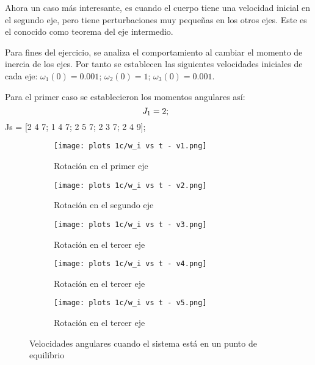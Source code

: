 \documentclass[letterpaper, 12pt]{article}
\begin{document}
\begin{enumerate}
\begin{enumerate}
Ahora un caso más interesante, es cuando el cuerpo tiene una velocidad inicial en el segundo eje, pero tiene perturbaciones muy pequeñas en los otros ejes. Este es el conocido como teorema del eje intermedio.

Para fines del ejercicio, se analiza el comportamiento al cambiar el momento de inercia de los ejes. Por tanto se establecen las siguientes velocidades iniciales de cada eje:
$\omega_1(0) = 0.001$; $\omega_2(0) = 1$; $\omega_3(0) = 0.001$.

Para el primer caso se establecieron los momentos angulares así:
$$J_1 = 2;\hspace{0.25cm}$$
Js = [2 4 7;
      1 4 7;
      2 5 7;
      2 3 7;
      2 4 9];

\begin{figure}[h!]
    \centering
    \hspace{1cm}
    \begin{subfigure}[h]{0.3\linewidth}
        \texttt{[image: plots 1c/w\_i vs t - v1.png]}
        \caption{\centering Rotación en el primer eje}
    \end{subfigure}
    \begin{subfigure}[h]{0.3\linewidth}
        \texttt{[image: plots 1c/w\_i vs t - v2.png]}
        \caption{\centering Rotación en el segundo eje}
    \end{subfigure}
    \begin{subfigure}[h]{0.3\linewidth}
        \texttt{[image: plots 1c/w\_i vs t - v3.png]}
        \caption{\centering Rotación en el tercer eje}
    \end{subfigure}
    \begin{subfigure}[h]{0.3\linewidth}
        \texttt{[image: plots 1c/w\_i vs t - v4.png]}
        \caption{\centering Rotación en el tercer eje}
    \end{subfigure}
    \begin{subfigure}[h]{0.3\linewidth}
        \texttt{[image: plots 1c/w\_i vs t - v5.png]}
        \caption{\centering Rotación en el tercer eje}
    \end{subfigure}
    \caption{Velocidades angulares cuando el sistema está en un punto de equilibrio}
    \label{fig:sistema en punto de equilibrio}
\end{figure}






\end{enumerate}
\end{enumerate}
\end{document}
